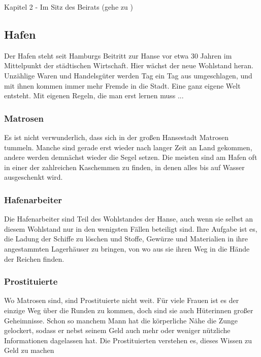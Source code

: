 Kapitel 2 - Im Sitz des Beirats (gehe zu \blue{\ref{kind}})


\subsection{Hafen}

Der Hafen steht seit Hamburgs Beitritt zur Hanse vor etwa 30 Jahren im Mittelpunkt der städtischen Wirtschaft. Hier wächst der neue Wohlstand heran. Unzählige Waren und Handelsgüter werden Tag ein Tag aus umgeschlagen, und mit ihnen kommen immer mehr Fremde in die Stadt. Eine ganz eigene Welt entsteht. Mit eigenen Regeln, die man erst lernen muss ...

\subsubsection*{Matrosen}
\label{Matrosen}

Es ist nicht verwunderlich, dass sich in der großen Hansestadt Matrosen tummeln. Manche sind gerade erst wieder nach langer Zeit an Land gekommen, andere werden demnächst wieder die Segel setzen. Die meisten sind am Hafen oft in einer der zahlreichen Kaschemmen zu finden, in denen alles bis auf Wasser ausgeschenkt wird.

\subsubsection*{Hafenarbeiter}
\label{Hafenarbeiter}

Die Hafenarbeiter sind Teil des Wohlstandes der Hanse, auch wenn sie selbst an diesem Wohlstand nur in den wenigsten Fällen beteiligt sind. Ihre Aufgabe ist es, die Ladung der Schiffe zu löschen und Stoffe, Gewürze und Materialien in ihre angestammten Lagerhäuser zu bringen, von wo aus sie ihren Weg in die Hände der Reichen finden.


\subsubsection*{Prostituierte}
\label{Prostituierte}

Wo Matrosen sind, sind Prostituierte nicht weit. Für viele Frauen ist es der einzige Weg über die Runden zu kommen, doch sind sie auch Hüterinnen großer Geheimnisse. Schon so manchem Mann hat die körperliche Nähe die Zunge gelockert, sodass er nebst seinem Geld auch mehr oder weniger nützliche Informationen dagelassen hat. Die Prostituierten verstehen es, dieses Wissen zu Geld zu machen

